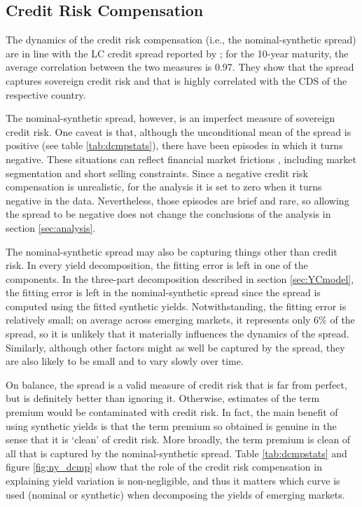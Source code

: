 \documentclass[a4paper, 12pt]{article}
\begin{document}
\begin{appendices}
	\subsection{Credit Risk Compensation} \label{sec:CRC}
	The dynamics of the credit risk compensation (i.e., the nominal-synthetic spread) are in line with the LC credit spread reported by \cite{DuSchreger:2016JoF}; for the 10-year maturity, the average correlation between the two measures is 0.97. They show that the spread captures sovereign credit risk and that is highly correlated with the CDS of the respective country. 
	
	The nominal-synthetic spread, however, is an imperfect measure of sovereign credit risk. One caveat is that, although the unconditional mean of the spread is positive (see table \ref{tab:dcmpstats}), there have been episodes in which it turns negative. These situations can reflect financial market frictions \citep{DuSchreger:2016JoF}, including market segmentation and short selling constraints. Since a negative credit risk compensation is unrealistic, for the analysis it is set to zero when it turns negative in the data. Nevertheless, those episodes are brief and rare, so allowing the spread to be negative does not change the conclusions of the analysis in section \ref{sec:analysis}. 
	
	The nominal-synthetic spread may also be capturing things other than credit risk. In every yield decomposition, the fitting error is left in one of the components. In the three-part decomposition described in section \ref{sec:YCmodel}, the fitting error is left in the nominal-synthetic spread since the spread is computed using the fitted synthetic yields. Notwithstanding, the fitting error is relatively small; on average across emerging markets, it represents only 6\% of the spread, so it is unlikely that it materially influences the dynamics of the spread. Similarly, although other factors might as well be captured by the spread, they are also likely to be small and to vary slowly over time. 
	
	On balance, the spread is a valid measure of credit risk that is far from perfect, but is definitely better than ignoring it. Otherwise, estimates of the term premium would be contaminated with credit risk. In fact, the main benefit of using synthetic yields is that the term premium so obtained is genuine in the sense that it is `clean' of credit risk. More broadly, the term premium is clean of all that is captured by the nominal-synthetic spread. Table \ref{tab:dcmpstats} and figure \ref{fig:ny_dcmp} show that the role of the credit risk compensation in explaining yield variation is non-negligible, and thus it matters which curve is used (nominal or synthetic) when decomposing the yields of emerging markets. 
	

\end{appendices}
\end{document}
